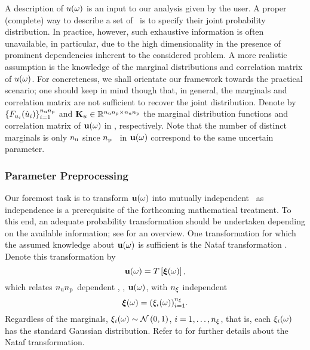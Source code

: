 A description of $u(\omega)$ is an input to our analysis given by the user.
A proper (complete) way to describe a set of \rvs\ is to specify their joint probability distribution.
In practice, however, such exhaustive information is often unavailable, in particular, due to the high dimensionality in the presence of prominent dependencies inherent to the considered problem.
A more realistic assumption is the knowledge of the marginal distributions and correlation matrix of $u(\omega)$.
For concreteness, we shall orientate our framework towards the practical scenario; one should keep in mind though that, in general, the marginals and correlation matrix are not sufficient to recover the joint distribution.
Denote by $\{ F_{u_i}(\hat{u}_i) \}_{i = 1}^{{n_\text{u}} {n_\text{p}}}$ and $\mathbf{K}_u \in \mathbb{R}^{{n_\text{u}} {n_\text{p}} \times {n_\text{u}} {n_\text{p}}}$ the marginal distribution functions and correlation matrix of $\mathbf{u}(\omega)$ in , respectively.
Note that the number of distinct marginals is only ${n_\text{u}}$ since ${n_\text{p}}$ \rvs\ in $\mathbf{u}(\omega)$ correspond to the same uncertain parameter.

\subsubsection{Parameter Preprocessing} 
Our foremost task is to transform $\mathbf{u}(\omega)$ into mutually independent \rvs\ as independence is a prerequisite of the forthcoming mathematical treatment.
To this end, an adequate probability transformation should be undertaken depending on the available information; see \cite{eldred2008} for an overview.
One transformation for which the assumed knowledge about $\mathbf{u}(\omega)$ is sufficient is the Nataf transformation \cite{li2008}.
Denote this transformation by
\begin{equation} \elab{probability-transformation}
  \vu(\o) = \transformation{\vz(\o)},
\end{equation}
which relates ${n_\text{u}} {n_\text{p}}$ dependent \rvs, \ie, $\mathbf{u}(\omega)$, with ${n_\xi}$ independent \rvs
\begin{equation} \elab{independent-random-variables}
  \vz(\o) = (\z_i(\o))_{i = 1}^\nvars.
\end{equation}
Regardless of the marginals, $\xi_i(\omega) \sim \mathcal{N}\left( 0, 1 \right)$, $i = 1, \dots, {n_\xi}$, that is, each $\xi_i(\omega)$ has the standard Gaussian distribution.
Refer to  for further details about the Nataf transformation.


